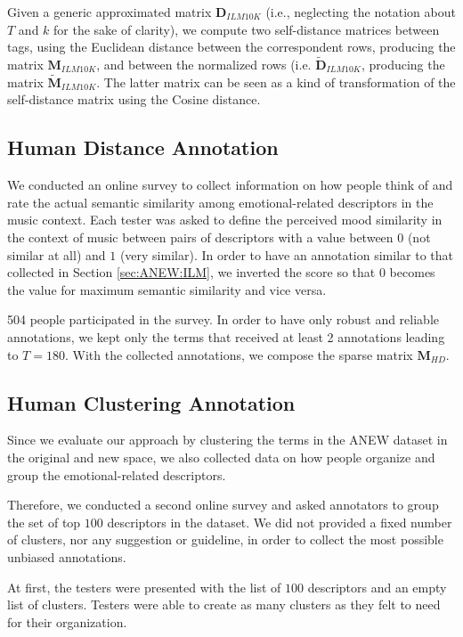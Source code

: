 Given a generic approximated matrix $\mathbf{D}_{ILM10K}$ (i.e., neglecting the notation about $T$ and $k$ for the sake of clarity), we compute two self-distance matrices between tags, using the Euclidean distance between the correspondent rows, producing the matrix  $\mathbf{M}_{ILM10K}$, and between the normalized rows (i.e.  $\mathbf{\tilde{D}}_{ILM10K}$, producing the matrix $ \tilde{\mathbf{M}}_{ILM10K}$. The latter matrix can be seen as a kind of transformation of the self-distance matrix using the Cosine distance.

\subsection{Human Distance Annotation}
\label{sec:ANEW:HDA}
We conducted an online survey to collect information on how people think of and rate the actual semantic similarity among emotional-related descriptors in the music context. Each tester was asked to define the perceived mood similarity in the context of music between pairs of descriptors with a value between $0$ (not similar at all) and $1$ (very similar). In order to have an annotation similar to that collected in Section \ref{sec:ANEW:ILM}, we inverted the score so that $0$ becomes the value for maximum semantic similarity and vice versa.

504 people participated in the survey. In order to have only robust and reliable annotations, we kept only the terms that received at least 2 annotations leading to $T=180$. With the collected annotations, we compose the sparse matrix $ \mathbf{M}_{HD}$.

\subsection{Human Clustering Annotation}
\label{sec:ANEW:HCA}
Since we evaluate our approach by clustering the terms in the ANEW dataset in the original and new space, we also collected data on how people organize and group the emotional-related descriptors.

Therefore, we conducted a second online survey and asked annotators to group the set of top $100$ descriptors in the dataset. We did not provided a fixed number of clusters, nor any suggestion or guideline, in order to collect the most possible unbiased annotations. 

At first, the testers were presented with the list of $100$ descriptors and an empty list of clusters. Testers were able to create as many clusters as they felt to need for their organization. 

